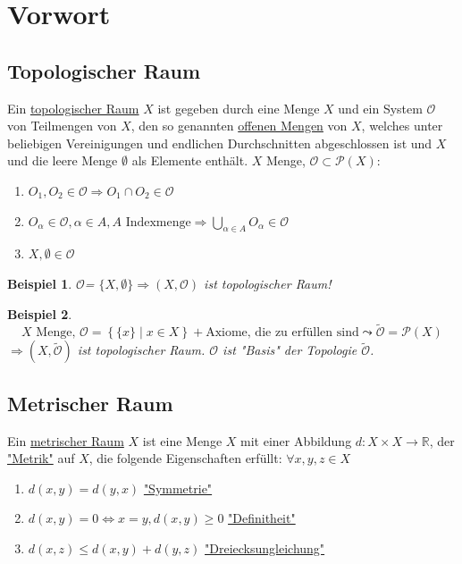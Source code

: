 \documentclass[a4paper,11pt,notitlepage]{report}
\newtheorem{example}{Beispiel}[chapter]
\newcommand{\R}{{\ensuremath{\mathbb{R}}}}
\newcommand{\OO}{{\ensuremath{\mathcal{O}}}}
\newenvironment{Kasten}[1]
{
\hspace{0.05\linewidth}
\begin{center}
\begin{minipage}{0.9\linewidth}
\setlength{\fboxsep}{10pt}
\definecolor{shadecolor}{gray}{1}
\definecolor{framecolor}{gray}{0}
\def\FrameCommand{\fcolorbox{framecolor}{shadecolor}}
\MakeFramed {\FrameRestore}
\subsection{#1}
\begin{itshape}
}
{
\end{itshape}
\endMakeFramed
\end{minipage}
\end{center}
}
\begin{document}
\section{Vorwort}
\begin{Kasten}{Topologischer Raum}
Ein \underline{topologischer Raum} $X$ ist gegeben durch eine Menge $X$ und ein System $\OO$ von Teilmengen von $X$, den so genannten \underline{offenen Mengen} von $X$, welches unter beliebigen Vereinigungen und endlichen Durchschnitten abgeschlossen ist und $X$ und die leere Menge $\emptyset$ als Elemente enthält.
\newline
$X$ Menge, $\OO \subset \mathcal{P}(X) \colon$
\begin{enumerate}[(1)]
	\item $O_1, O_2 \in \OO \Rightarrow O_1 \cap O_2 \in \OO$
	\item $O_\alpha \in \OO, \alpha \in A, A \text{ Indexmenge} \Rightarrow \bigcup\limits_{\alpha \in A}{O_\alpha} \in \OO$
	\item $X, \emptyset \in \OO$
\end{enumerate}
\end{Kasten}

\begin{example}
\OO = $\{X, \emptyset\} \Rightarrow (X,\OO)$ ist topologischer Raum!
\end{example}

\begin{example}
$$X \text{ Menge, }\OO = \left\{\{x\} \mid x\in X\right\} + \text{Axiome, die zu erfüllen sind} \leadsto \tilde{\OO} = \mathcal{P}(X)$$
$\Rightarrow (X,\tilde{\OO})$ ist topologischer Raum.
$\OO$ ist "Basis" der Topologie $\tilde{\OO}$.
\end{example}

\begin{Kasten}{Metrischer Raum}
Ein \underline{metrischer Raum} $X$ ist eine Menge $X$ mit einer Abbildung $d \colon X \times X \rightarrow \R$, der \underline{"Metrik"} auf $X$, die folgende Eigenschaften erfüllt:
$\forall x,y,z \in X$
\begin{enumerate}[(1)]
	\item $d(x,y) = d(y,x)$ \underline{"Symmetrie"}
	\item $d(x,y) = 0 \Leftrightarrow x = y, d(x,y) \geq 0$ \underline{"Definitheit"}
	\item $d(x,z) \leq d(x,y) + d(y,z)$ \underline{"Dreiecksungleichung"}
\end{enumerate}
\end{Kasten}
\end{document}
